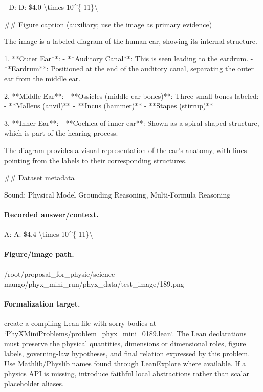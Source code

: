 - D: D: \$4.0 \textbackslash{}times 10\textasciicircum{}\{-11\}\textbackslash{}

\#\# Figure caption (auxiliary; use the image as primary evidence)

The image is a labeled diagram of the human ear, showing its internal structure.

1. **Outer Ear**:
   - **Auditory Canal**: This is seen leading to the eardrum.
   - **Eardrum**: Positioned at the end of the auditory canal, separating the outer ear from the middle ear.

2. **Middle Ear**:
   - **Ossicles (middle ear bones)**: Three small bones labeled:
     - **Malleus (anvil)**
     - **Incus (hammer)**
     - **Stapes (stirrup)**

3. **Inner Ear**:
   - **Cochlea of inner ear**: Shown as a spiral-shaped structure, which is part of the hearing process.

The diagram provides a visual representation of the ear's anatomy, with lines pointing from the labels to their corresponding structures.

\#\# Dataset metadata

Sound; Physical Model Grounding Reasoning, Multi-Formula Reasoning

\paragraph{Recorded answer/context.}
A: A: \$4.4 \textbackslash{}times 10\textasciicircum{}\{-11\}\textbackslash{}

\paragraph{Figure/image path.}
/root/proposal\_for\_physic/science-mango/phyx\_mini\_run/phyx\_data/test\_image/189.png

\paragraph{Formalization target.}
create a compiling Lean file with sorry bodies at `PhyXMiniProblems/problem\_phyx\_mini\_0189.lean`. The Lean declarations must preserve the physical quantities, dimensions or dimensional roles, figure labels, governing-law hypotheses, and final relation expressed by this problem.
Use Mathlib/Physlib names found through LeanExplore where available. If a physics API is missing, introduce faithful local abstractions rather than scalar placeholder aliases.

